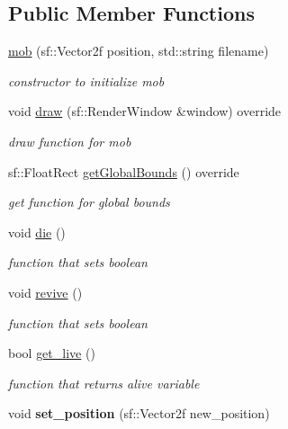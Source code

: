 \subsection*{Public Member Functions}
\begin{DoxyCompactItemize}
\item 
\hyperlink{classmob_ac524dd40986df00721239b66c552437e}{mob} (sf\+::\+Vector2f position, std\+::string filename)
\begin{DoxyCompactList}\small\item\em constructor to initialize mob \end{DoxyCompactList}\item 
void \hyperlink{classmob_a52f5e29b2ac2d87c8c1be7e0ff5ec96b}{draw} (sf\+::\+Render\+Window \&window) override
\begin{DoxyCompactList}\small\item\em draw function for mob \end{DoxyCompactList}\item 
sf\+::\+Float\+Rect \hyperlink{classmob_af3859378fad2a5f93a1c4d833ff74d5d}{get\+Global\+Bounds} () override
\begin{DoxyCompactList}\small\item\em get function for global bounds \end{DoxyCompactList}\item 
void \hyperlink{classmob_ae892b3ce84f4aa16411b385abb5410c8}{die} ()
\begin{DoxyCompactList}\small\item\em function that sets boolean \end{DoxyCompactList}\item 
void \hyperlink{classmob_a3bce6c06653881f8be86fbc60a2b67cb}{revive} ()
\begin{DoxyCompactList}\small\item\em function that sets boolean \end{DoxyCompactList}\item 
bool \hyperlink{classmob_ab327a1798c02be3f9db7c1d01b17ba02}{get\+\_\+live} ()
\begin{DoxyCompactList}\small\item\em function that returns alive variable \end{DoxyCompactList}\item 
\mbox{\label{classmob_a6556e84e416fd496450d18dd1d0eb1f2}} 
void {\bfseries set\+\_\+position} (sf\+::\+Vector2f new\+\_\+position)
\end{DoxyCompactItemize}

